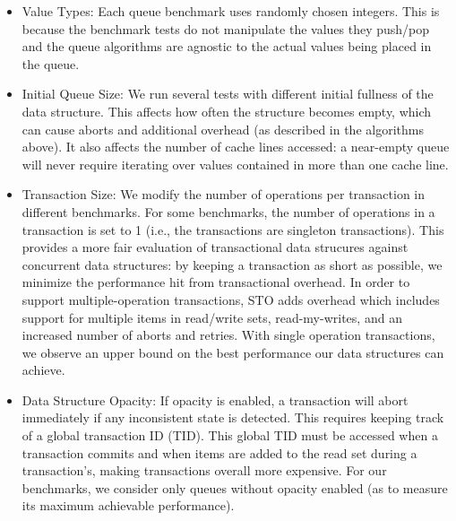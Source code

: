 \begin{itemize}
\item Value Types: Each queue benchmark uses randomly chosen integers. This is because the benchmark tests do not manipulate the values they push/pop and the queue algorithms are agnostic to the actual values being placed in the queue.

\item Initial Queue Size: We run several tests with different initial fullness of the data structure. This affects how often the structure becomes empty, which can cause aborts and additional overhead (as described in the algorithms above). It also affects the number of cache lines accessed: a near-empty queue will never require iterating over values contained in more than one cache line.

\item Transaction Size: We modify the number of operations per transaction in different benchmarks. For some benchmarks, the number of operations in a transaction is set to 1 (i.e., the transactions are singleton transactions). This provides a more fair evaluation of transactional data strucures against concurrent data structures: by keeping a transaction as short as possible, we minimize the performance hit from transactional overhead. In order to support multiple-operation transactions, STO adds overhead which includes support for multiple items in read/write sets, read-my-writes, and an increased number of aborts and retries. With single operation transactions, we observe an upper bound on the best performance our data structures can achieve.

\item Data Structure Opacity: If opacity is enabled, a transaction will abort immediately if any inconsistent state is detected. This requires keeping track of a global transaction ID (TID). This global TID must be accessed when a transaction commits and when items are added to the read set during a transaction's, making transactions overall more expensive. For our benchmarks, we consider only queues without opacity enabled (as to measure its maximum achievable performance).
\end{itemize}

